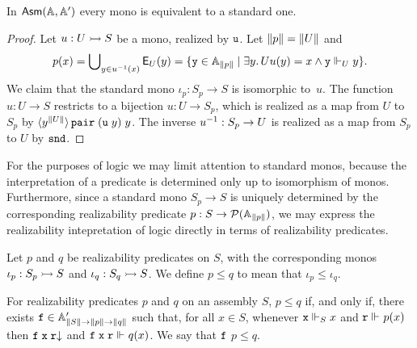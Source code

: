 \begin{proposition}
  In $\AsmA$ every mono is equivalent to a standard one.
\end{proposition}

\begin{proof}
  Let $u : U \monoto S$ be a mono, realized by $\R{u}$.
  Let $\T{p} = \T{U}$ and
  \begin{equation*}
    p(x) = \tbigcup_{y \in \inv{u}(x)} \Ex_U(y) =
    \set{\R{y} \in \Atyp{\T{p}} \such \some{y}{U}{u(y) = x \land \R{y} \rz[U] y}}.
  \end{equation*}
  We claim that the standard mono $\iota_p : S_p \to S$ is
  isomorphic to~$u$. The function $u : U \to S$ restricts to a
  bijection $u : U \to S_p$, which is realized as a map from $U$
  to $S_p$ by
  $\tpcalam{y}{\T{U}} \combPair\;(\R{u}\;y)\;y$. The inverse
  $\inv{u} : S_p \to U$ is realized as a map from $S_p$ to
  $U$ by $\combSnd$.
\end{proof}

For the purposes of logic we may limit attention to standard monos,
because the interpretation of a predicate is determined only up to
isomorphism of monos. Furthermore, since a standard mono $S_p
\to S$ is uniquely determined by the corresponding realizability
predicate $p : S \to \pow{\Atyp{\T{p}}}$, we may express the
realizability intepretation of logic directly in terms of
realizability predicates.

Let $p$ and $q$ be realizability predicates on $S$, with the
corresponding monos $\iota_p : S_p \monoto S$ and $\iota_q
: S_q \monoto S$. We define $p \leq q$ to mean that
$\iota_p \leq \iota_q$.

\begin{lemma}
  \label{lemma:realizability-predicate-leq}%
  For realizability predicates $p$ and $q$ on an assembly $S$,
  $p \leq q$ if, and only if, there exists $\R{f} \in \subAtyp{\T{S}
    \to \T{p} \to \T{q}}$ such that, for all $x \in S$, whenever $\R{x}
  \rz[S] x$ and $\R{r} \rz p(x)$ then $\defined{\R{f}\;\R{x}\;\R{r}}$
  and $\R{f}\;\R{x}\;\R{r} \rz q(x)$. We say that $\R{f}$
   $p \leq q$.
\end{lemma}

